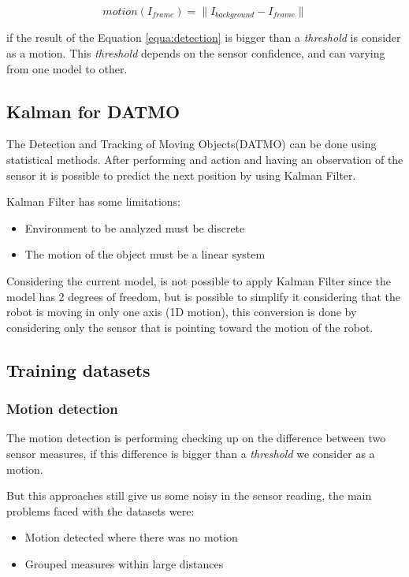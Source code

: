 \documentclass{article}
\begin{document}
\begin{equation}
motion(I_{frame})=\parallel I_{background}-I_{frame} \parallel
\label{equa:detection}
\end{equation}

if the result of the Equation \ref{equa:detection} is bigger than a \emph{threshold} is consider as a motion. This \emph{threshold} depends on the sensor confidence, and can varying from one model to other. 

\subsection{Kalman for DATMO}
The Detection and Tracking of Moving Objects(DATMO) can be done using statistical methods. After performing and action and having an observation of the sensor it is possible to predict the next position by using Kalman Filter. 

Kalman Filter has some limitations:
\begin{itemize}
\item Environment to be analyzed must be discrete
\item The motion of the object must be a linear system
\end{itemize}

Considering the current model, is not possible to apply Kalman Filter since the model has 2 degrees of freedom, but is possible to simplify it considering that the robot is moving in only one axis (1D motion), this conversion is done by considering only the sensor that is pointing toward the motion of the robot.

\subsection{Training datasets}

\subsubsection{Motion detection}

The motion detection is performing checking up on the difference between two sensor measures, if this difference is bigger than a \emph{threshold} we consider as a motion.

But this approaches still give us some noisy in the sensor reading, the main problems faced with the datasets were:
\begin{itemize}
\item Motion detected where there was no motion
\item Grouped measures within large distances
\end{itemize}
\end{document}
